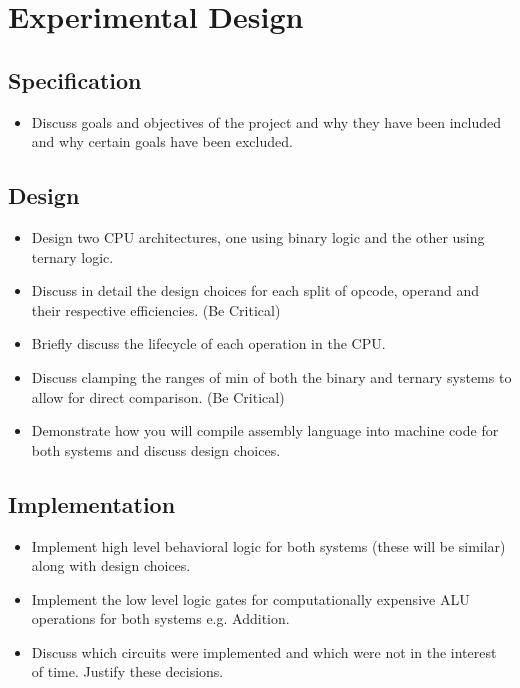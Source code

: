 \documentclass[12pt]{article}
\begin{document}
\section{Experimental Design}

\subsection{Specification}

\begin{itemize}
    \item Discuss goals and objectives of the project and why they have been included and why certain goals have been excluded.
\end{itemize}

\subsection{Design}

\begin{itemize}
    \item Design two CPU architectures, one using binary logic and the other using ternary logic.
    \item Discuss in detail the design choices for each split of opcode, operand and their respective efficiencies. (Be Critical)
    \item Briefly discuss the lifecycle of each operation in the CPU.
    \item Discuss clamping the ranges of min of both the binary and ternary systems to allow for direct comparison. (Be Critical)
    \item Demonstrate how you will compile assembly language into machine code for both systems and discuss design choices.
\end{itemize}

\subsection{Implementation}

\begin{itemize}
    \item Implement high level behavioral logic for both systems (these will be similar) along with design choices.
    \item Implement the low level logic gates for computationally expensive ALU operations for both systems e.g. Addition.
    \item Discuss which circuits were implemented and which were not in the interest of time. Justify these decisions.
\end{itemize}
\end{document}

